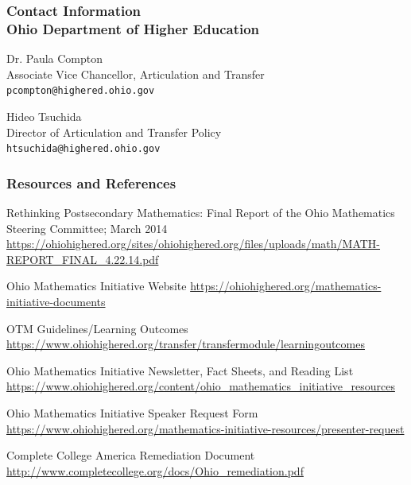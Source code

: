 \documentclass[13pt]{beamer}
\newcounter{a}
\newcounter{b}
\begin{document}
\begin{frame}
  \frametitle{Contact Information \\ Ohio Department of Higher Education}


Dr. Paula Compton \\
    Associate Vice Chancellor, Articulation and Transfer \\
    \texttt{pcompton@highered.ohio.gov}

    \vfill
    
Hideo Tsuchida \\
    Director of Articulation and Transfer Policy \\
    \texttt{htsuchida@highered.ohio.gov}

    \vfill
    
\end{frame}

\begin{frame}[allowframebreaks]
  \frametitle{Resources and References}
Rethinking Postsecondary Mathematics: Final Report of the Ohio Mathematics Steering Committee; March 2014 \url{https://ohiohighered.org/sites/ohiohighered.org/files/uploads/math/MATH-REPORT_FINAL_4.22.14.pdf}

Ohio Mathematics Initiative Website 
\url{https://ohiohighered.org/mathematics-initiative-documents}

OTM Guidelines/Learning Outcomes  \url{https://www.ohiohighered.org/transfer/transfermodule/learningoutcomes}

Ohio Mathematics Initiative Newsletter, Fact Sheets, and Reading List    \url{https://www.ohiohighered.org/content/ohio_mathematics_initiative_resources}

Ohio Mathematics Initiative Speaker Request Form  \url{https://www.ohiohighered.org/mathematics-initiative-resources/presenter-request}

Complete College America Remediation Document  \url{http://www.completecollege.org/docs/Ohio_remediation.pdf}


\end{frame}
\end{document}
